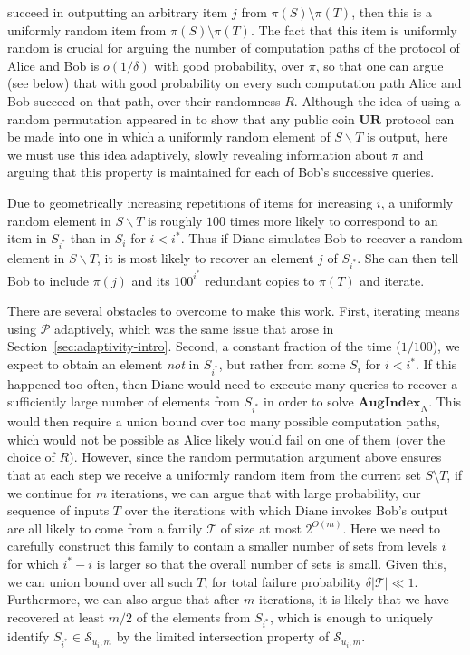 \documentclass[11pt]{article}
\newcommand{\aug}{\mathbf{AugIndex}\xspace}
\newcommand{\ur}{\mathbf{UR}\xspace}
\begin{document}
succeed in outputting an arbitrary item $j$ from $\pi(S) \setminus \pi(T)$, then this is a uniformly random item from
$\pi(S) \setminus \pi(T)$. The fact that this item is uniformly random is crucial for arguing the number of computation paths
of the protocol of Alice and Bob is $o(1/\delta)$ with good probability, over $\pi$, so that one can argue (see below) that with good probability on
every such computation path Alice and Bob succeed on that path, over their randomness $R$. Although the idea of using a random permutation appeared in \cite{JowhariST11} to show that any public coin $\ur$ protocol can be made
into one in which a uniformly random element of $S \backslash T$ is output, here we must use this idea adaptively, slowly revealing
information about $\pi$ and arguing that this property is maintained for each of Bob's successive queries.  

Due to geometrically increasing repetitions of items for increasing $i$, a uniformly random element in $S\backslash T$ is roughly $100$ times more likely to correspond to an item in $S_{i^*}$ than in $S_i$ for $i<i^*$. Thus if Diane simulates Bob to recover a random element in $S\backslash T$, it is most likely to recover an element $j$ of $S_{i^*}$. She can then tell Bob to include $\pi(j)$ and its $100^{i^*}$ redundant copies to $\pi(T)$ and iterate.

There are several obstacles to overcome to make this work. First, iterating means using $\mathcal P$ adaptively, which was the same issue that arose in Section~\ref{sec:adaptivity-intro}. Second, a constant fraction of the time ($1/100$), we expect to obtain an element {\em not} in $S_{i^*}$, but rather from some $S_i$ for $i<i^*$. If this happened too often, then Diane would need to execute many 
queries to recover a sufficiently large number of elements from $S_{i^*}$ in order to solve $\aug_N$. This would then require a union bound over too many possible computation paths, which would not be possible as Alice likely would fail on one
of them (over the choice of $R$). 
However, since the random permutation argument above ensures that at each step we receive
a uniformly random item from the current set $S \setminus T$, if we continue for $m$ iterations, we can argue that with large probability, our sequence of inputs $T$ over the iterations with which Diane invokes Bob's output are all likely to come from a family $\mathcal T$ of size at most $2^{O(m)}$. Here we need to carefully
construct this family to contain a smaller number of sets from levels $i$ for which $i^*-i$
is larger so that the overall number of sets is small. Given this, we can union bound over all such $T$, for total failure probability $\delta |\mathcal T| \ll 1$. Furthermore, we can also argue that after $m$ iterations, it is likely that we have recovered at least $m/2$ of the elements from $S_{i^*}$, which is enough to uniquely identify $S_{i^*}\in \mathcal S_{u_i,m}$ by the limited intersection property of $\mathcal S_{u_i,m}$.
\end{document}
